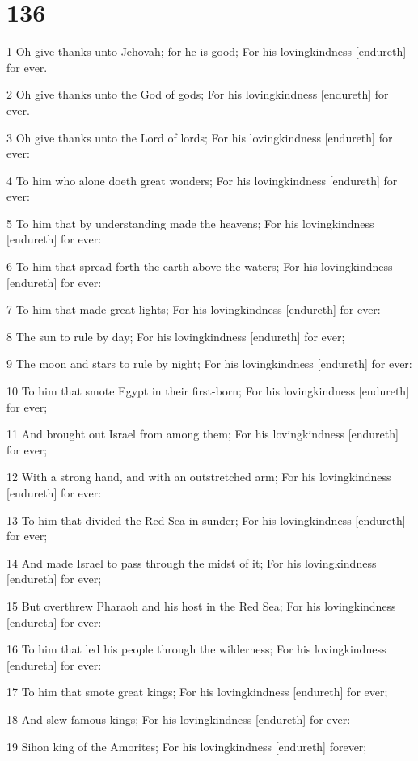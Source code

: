 \chapter{136}

\par 1 Oh give thanks unto Jehovah; for he is good; For his lovingkindness [endureth] for ever.
\par 2 Oh give thanks unto the God of gods; For his lovingkindness [endureth] for ever.
\par 3 Oh give thanks unto the Lord of lords; For his lovingkindness [endureth] for ever:
\par 4 To him who alone doeth great wonders; For his lovingkindness [endureth] for ever:
\par 5 To him that by understanding made the heavens; For his lovingkindness [endureth] for ever:
\par 6 To him that spread forth the earth above the waters; For his lovingkindness [endureth] for ever:
\par 7 To him that made great lights; For his lovingkindness [endureth] for ever:
\par 8 The sun to rule by day; For his lovingkindness [endureth] for ever;
\par 9 The moon and stars to rule by night; For his lovingkindness [endureth] for ever:
\par 10 To him that smote Egypt in their first-born; For his lovingkindness [endureth] for ever;
\par 11 And brought out Israel from among them; For his lovingkindness [endureth] for ever;
\par 12 With a strong hand, and with an outstretched arm; For his lovingkindness [endureth] for ever:
\par 13 To him that divided the Red Sea in sunder; For his lovingkindness [endureth] for ever;
\par 14 And made Israel to pass through the midst of it; For his lovingkindness [endureth] for ever;
\par 15 But overthrew Pharaoh and his host in the Red Sea; For his lovingkindness [endureth] for ever:
\par 16 To him that led his people through the wilderness; For his lovingkindness [endureth] for ever:
\par 17 To him that smote great kings; For his lovingkindness [endureth] for ever;
\par 18 And slew famous kings; For his lovingkindness [endureth] for ever:
\par 19 Sihon king of the Amorites; For his lovingkindness [endureth] forever;
